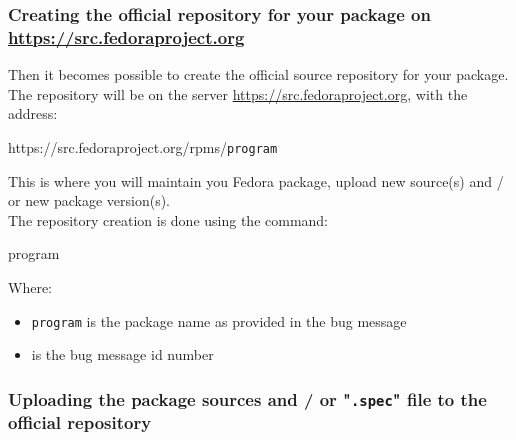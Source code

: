 \subsubsection{Creating the official repository for your package on \href{https://src.fedoraproject.org}{https://src.fedoraproject.org}}
\label{create_frepo}
Then it becomes possible to create the official source repository for your package. \\
The repository will be on the server \href{https://src.fedoraproject.org}{https://src.fedoraproject.org}, 
with the address:
\begin{center}https://src.fedoraproject.org/rpms/\texttt{program} \end{center}
This is where you will maintain you Fedora package, upload new source(s) and / or new package version(s). \\[0.25cm]
The repository creation is done using the  command:
\begin{script}
\fprompt{~}   program 
\end{script}
Where: 
\begin{itemize}
\item \texttt{program} is the package name as provided in the bug message
\item {} is the bug message id number
\end{itemize}

\subsubsection{Uploading the package sources and / or "\texttt{.spec}" file to the official repository}

